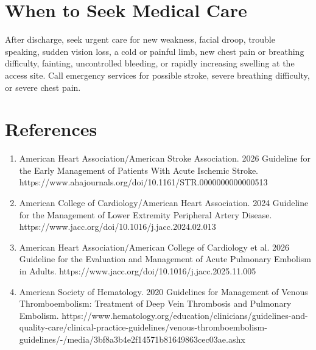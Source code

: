 \section*{When to Seek Medical Care}
After discharge, seek urgent care for new weakness, facial droop, trouble speaking, sudden vision loss, a cold or painful limb, new chest pain or breathing difficulty, fainting, uncontrolled bleeding, or rapidly increasing swelling at the access site. Call emergency services for possible stroke, severe breathing difficulty, or severe chest pain.

\section*{References}
\begin{enumerate}
  \item American Heart Association/American Stroke Association. 2026 Guideline for the Early Management of Patients With Acute Ischemic Stroke. https://www.ahajournals.org/doi/10.1161/STR.0000000000000513
  \item American College of Cardiology/American Heart Association. 2024 Guideline for the Management of Lower Extremity Peripheral Artery Disease. https://www.jacc.org/doi/10.1016/j.jacc.2024.02.013
  \item American Heart Association/American College of Cardiology et al. 2026 Guideline for the Evaluation and Management of Acute Pulmonary Embolism in Adults. https://www.jacc.org/doi/10.1016/j.jacc.2025.11.005
  \item American Society of Hematology. 2020 Guidelines for Management of Venous Thromboembolism: Treatment of Deep Vein Thrombosis and Pulmonary Embolism. https://www.hematology.org/education/clinicians/guidelines-and-quality-care/clinical-practice-guidelines/venous-thromboembolism-guidelines/-/media/3bf8a3b4e2f14571b81649863cec03ae.ashx
\end{enumerate}

\clearpage
